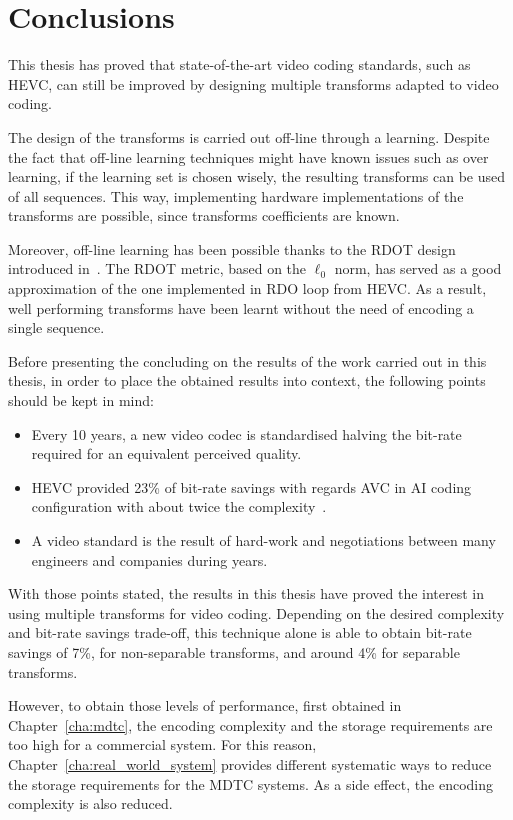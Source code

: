 \documentclass[11pt,a4paper,openright,twoside]{book}
\numberwithin{equation}{section} %
\numberwithin{figure}{section} %
\numberwithin{table}{section} %
\begin{document}
\section*{Conclusions}
\label{sec:conclusions}

This thesis has proved that state-of-the-art video coding standards, such as
\ac{HEVC}, can still be improved by designing multiple transforms adapted to
video coding.

The design of the transforms is carried out off-line through a learning.
Despite the fact that off-line learning techniques might have known issues
such as over learning, if the learning set is chosen wisely, the resulting
transforms can be used of all sequences.
This way, implementing hardware implementations of the transforms are
possible, since transforms coefficients are known.

Moreover, off-line learning has been possible thanks to the \ac{RDOT} design
introduced in~\cite{sezer-08-sparse-orthonormal-transforms}.
The \ac{RDOT} metric, based on the $\ell_0$ norm, has served as a good
approximation of the one implemented in \ac{RDO} loop  from \ac{HEVC}.
As a result, well performing transforms have been learnt without the need of
encoding a single sequence.

Before presenting the concluding on the results of the work carried out in
this thesis, in order to place the obtained results into context, the
following points should be kept in mind:
\begin{itemize}
	\item Every 10 years, a new video codec is standardised halving the
		bit-rate required for an equivalent perceived quality.
	\item \acs{HEVC} provided 23\% of bit-rate savings with regards \acs{AVC}
		in \acs{AI} coding configuration with about twice the
		complexity~\cite{JCTVC-M0329}.
	\item A video standard is the result of hard-work and negotiations between
		many engineers and companies during years.
\end{itemize}

With those points stated, the results in this thesis have proved the interest
in using multiple transforms for video coding.
Depending on the desired complexity and bit-rate savings trade-off, this
technique alone is able to obtain bit-rate savings of 7\%, for non-separable
transforms, and around 4\% for separable transforms.

However, to obtain those levels of performance, first obtained in
Chapter~\ref{cha:mdtc}, the encoding complexity and the storage requirements
are too high for a commercial system.
For this reason, Chapter~\ref{cha:real_world_system} provides different
systematic ways to reduce the storage requirements for the \ac{MDTC} systems.
As a side effect, the encoding complexity is also reduced.
\end{document}
